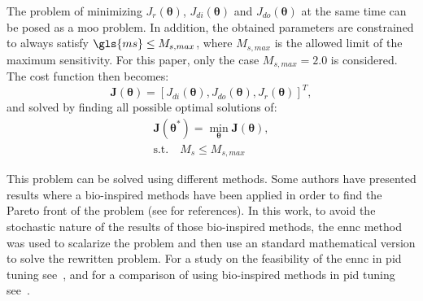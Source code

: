 The problem of minimizing $J_r(\bm{\theta})$, $J_{di}(\bm{\theta})$ and $J_{do}(\bm{\theta})$ at the same time can be posed as a \gls{moo} problem. In addition, the obtained parameters are constrained to always satisfy  $\gls{ms} \leq M_{s,max}$, where $M_{s,max}$ is the allowed limit of the maximum sensitivity. For this paper, only the case $M_{s,max} = 2.0$ is considered. The cost function then becomes:
%
\begin{equation}  %
\textbf{J}(\bm{\theta})=\left[J_{di}(\bm{\theta}), J_{do}(\bm{\theta}), J_{r}(\bm{\theta})\right]^T,
\label{J}
\end{equation}
%
and solved by finding all possible optimal solutions of:
%
\begin{equation}  %
\begin{gathered}
\textbf{J}(\bm{\theta}^*) = \min_{\bm{\theta}} \textbf{J}(\bm{\theta}),\\
\text{s.t.} \quad  M_s \leq M_{s,max}
\end{gathered}
\label{probmoo}
\end{equation}

This problem can be solved using different methods. Some authors have presented results where a bio-inspired methods have been applied in order to find the Pareto front of the problem (see for \cite{Sayed2012, Reynoso-Meza2012, Reynoso-Meza2012b, Chiha2012} references). In this work, to avoid the stochastic nature of the results of those bio-inspired methods, the \gls{ennc} method was used to scalarize the problem and then use an standard mathematical version to solve the rewritten problem. For a study on the feasibility of the \gls{ennc} in \gls{pid} tuning see~\textcite{Contreras-Leiva2016}, and for a comparison of using bio-inspired methods in \gls{pid} tuning see~\textcite{Cespedes2016}.


